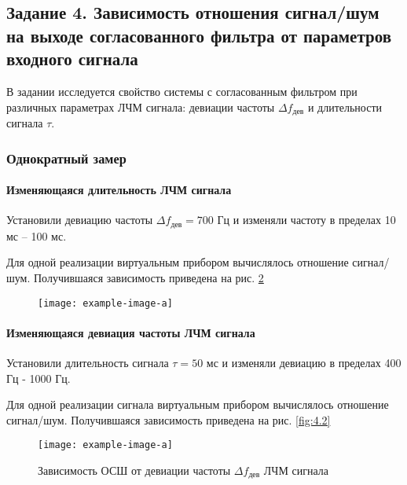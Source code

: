 \subsection{Задание 4. Зависимость отношения сигнал/шум на выходе согласованного
фильтра от параметров входного сигнала}

В задании исследуется свойство системы с согласованным фильтром при различных
параметрах ЛЧМ сигнала: девиации частоты $\Delta f_{\text{дев}}$ и длительности
сигнала $\tau$.

\subsubsection{Однократный замер}%
\label{ssub:odnokratnyi_zamer}



\paragraph{Изменяющаяся длительность ЛЧМ сигнала}%
\label{par:izmeniaiushchaiasia_dlitel_nost_signala_tau_}

Установили девиацию частоты $\Delta f_{\text{дев}}= 700$ Гц и изменяли частоту
в пределах 10 мс -- 100 мс. 

Для одной реализации виртуальным прибором
вычислялось отношение сигнал/шум. Получившаяся зависимость приведена на рис.
\ref{fig:4.1}

\begin{figure}[h!]
    \centering
    \texttt{[image: example-image-a]}
    \caption{}
    \label{fig:4.1}
\end{figure}

\paragraph{Изменяющаяся девиация частоты ЛЧМ сигнала}%
\label{par:izmeniaiushchaiasia_deviatsiia_chastoty_signala}
Установили длительность сигнала $\tau=50$ мс и изменяли девиацию в пределах
400 Гц - 1000 Гц.

Для одной реализации сигнала виртуальным прибором
вычислялось отношение сигнал/шум. Получившаяся зависимость приведена на рис.
\ref{fig:4.2}

\begin{figure}[h!]
    \centering
    \texttt{[image: example-image-a]}
    \caption{Зависимость ОСШ от девиации частоты $\Delta f_{\text{дев}}$ ЛЧМ
    сигнала}
    \label{fig:4.1}
\end{figure}




